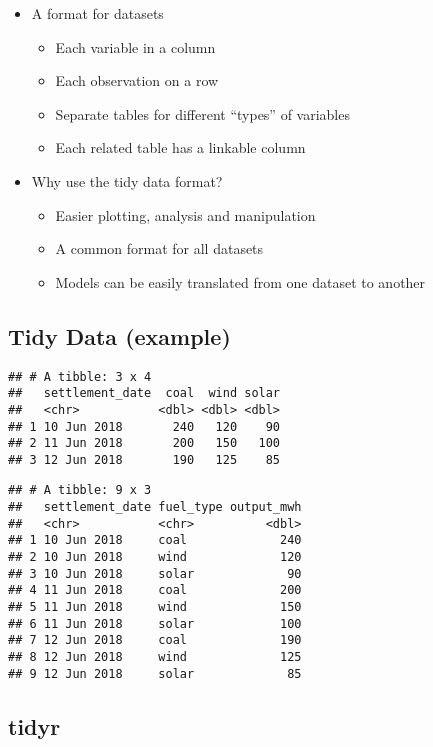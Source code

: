 \documentclass[]{article}
\providecommand{\tightlist}{%
  \setlength{\itemsep}{0pt}\setlength{\parskip}{0pt}}
\begin{document}
\begin{itemize}
\tightlist
\item
  A format for datasets

  \begin{itemize}
  \tightlist
  \item
    Each variable in a column
  \item
    Each observation on a row
  \item
    Separate tables for different ``types'' of variables
  \item
    Each related table has a linkable column
  \end{itemize}
\item
  Why use the tidy data format?

  \begin{itemize}
  \tightlist
  \item
    Easier plotting, analysis and manipulation
  \item
    A common format for all datasets
  \item
    Models can be easily translated from one dataset to another
  \end{itemize}
\end{itemize}

\subsection{Tidy Data (example)}\label{tidy-data-example}

\begin{verbatim}
## # A tibble: 3 x 4
##   settlement_date  coal  wind solar
##   <chr>           <dbl> <dbl> <dbl>
## 1 10 Jun 2018       240   120    90
## 2 11 Jun 2018       200   150   100
## 3 12 Jun 2018       190   125    85
\end{verbatim}

\begin{verbatim}
## # A tibble: 9 x 3
##   settlement_date fuel_type output_mwh
##   <chr>           <chr>          <dbl>
## 1 10 Jun 2018     coal             240
## 2 10 Jun 2018     wind             120
## 3 10 Jun 2018     solar             90
## 4 11 Jun 2018     coal             200
## 5 11 Jun 2018     wind             150
## 6 11 Jun 2018     solar            100
## 7 12 Jun 2018     coal             190
## 8 12 Jun 2018     wind             125
## 9 12 Jun 2018     solar             85
\end{verbatim}

\subsection{tidyr}\label{tidyr}
\end{document}
